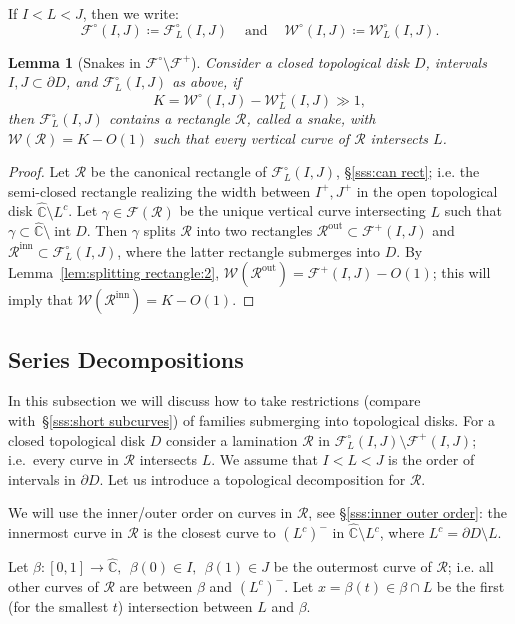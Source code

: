 \documentclass{amsart}
\renewcommand{\sp}{{\ \ }}
\newcommand{\1}{{\mathbb 1 }}
\newcommand{\Fam}{{\mathcal F}}
\newcommand{\Width}{{\mathcal W}}
\newcommand\RR{\mathcal{R}}
\newcommand\intr{\operatorname{int}}
\newcommand\inn{{\operatorname{inn}}}
\newcommand\out{{\operatorname{out}}}
\newcommand{\wC}{\widehat{\mathbb{C}}}
\newtheorem{lem}[thm]{Lemma}
\theoremstyle{remark}
\numberwithin{equation}{section}
\theoremstyle{definition}
\begin{document}
If $I<L<J$, then we write:
\[ \Fam^\circ (I,J) \coloneqq \Fam^\circ_L(I,J)\sp\sp\text{ and }\sp\sp \Width^\circ (I,J) \coloneqq \Width^\circ_L(I,J).\]


\begin{lem}[Snakes in $\Fam^\circ \setminus \Fam^+$]
\label{lem:Fam^circ:R}Consider a closed topological disk $D$, intervals $I,J\subset\partial D$, and $\Fam_L^\circ(I,J)$ as above, if 
\[K =\Width^\circ(I,J)-\Width^+_L(I,J)\gg 1,\] then $\Fam^\circ_L(I,J)$ contains a rectangle $\RR$, called a \emph{snake}, with $\Width(\RR)=K-O(1)$ such that every vertical curve of $\RR$ intersects $L$. 
\end{lem}

\begin{proof}
Let $\RR$ be the canonical rectangle of $\Fam^\circ_L(I,J)$, \S\ref{sss:can rect}; i.e. the semi-closed rectangle realizing the width between $I^+,J^+$ in the open topological disk $\wC\setminus L^c$. Let $\gamma\in \Fam(\RR)$ be the unique vertical curve intersecting $L$ such that $\gamma\subset \wC\setminus \intr D$. Then $\gamma$ splits $\RR$ into two rectangles $\RR^\out\subset \Fam^+(I,J)$ and $\RR^\inn\subset \Fam_L^\circ(I,J)$, where the latter rectangle submerges into $D$. By Lemma~\ref{lem:splitting rectangle:2}, $\Width(\RR^\out)=\Fam^+(I,J)-O(1)$; this will imply that $\Width(\RR^\inn)=K-O(1)$.
\end{proof}






\subsection{Series Decompositions}
\label{sss:SerDecomp for F circ}
 In this subsection we will discuss how to take restrictions (compare with~\S\ref{sss:short subcurves}) of families submerging into topological disks. For a closed topological disk $D$ consider a lamination $\RR$ in $\Fam^\circ_L(I,J)\setminus \Fam^+(I,J)$; i.e.~every curve in $\RR$ intersects $L$.  We assume that $I<L<J$ is the order of intervals in $\partial D$. Let us introduce a topological decomposition for $\RR$. 

We will use the inner/outer order on curves in $\RR$, see \S\ref{sss:inner outer order}: the innermost curve in $\RR$ is the closest curve to $( L^c )^-$ in $\wC\setminus L^c$, where $L^c=\partial D \setminus L$.



Let $\beta\colon [0,1]\to \wC, \sp \beta(0)\in I,\sp \beta(1)\in J$ be the outermost curve of $\RR$; i.e. all other curves of $\RR$ are between $\beta$ and $(L^c)^-$. Let $x=\beta(t)\in \beta \cap L$ be the first (for the smallest $t$) intersection between $L$ and $\beta$.  
\end{document}

